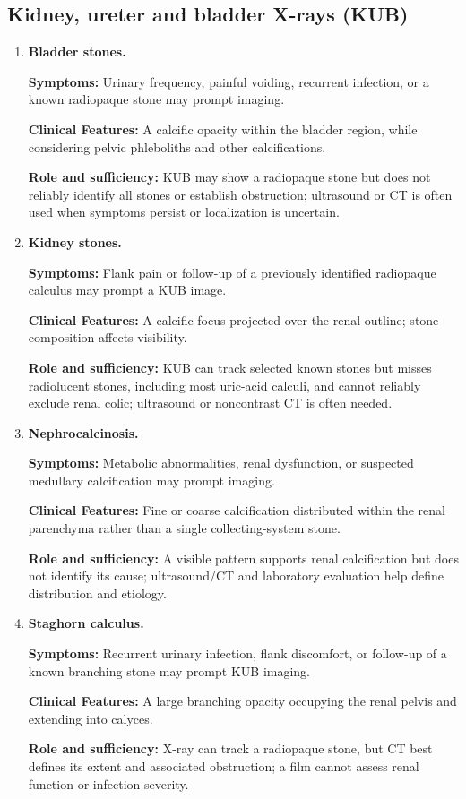 \subsection{Kidney, ureter and bladder X-rays (KUB)}
\begin{enumerate}[leftmargin=*,itemsep=0.45em,topsep=0.4em]
\item \textbf{Bladder stones.}\par\noindent\textbf{Symptoms:} Urinary frequency, painful voiding, recurrent infection, or a known radiopaque stone may prompt imaging.\par\noindent\textbf{Clinical Features:} A calcific opacity within the bladder region, while considering pelvic phleboliths and other calcifications.\par\noindent\textbf{Role and sufficiency:} KUB may show a radiopaque stone but does not reliably identify all stones or establish obstruction; ultrasound or CT is often used when symptoms persist or localization is uncertain.
\item \textbf{Kidney stones.}\par\noindent\textbf{Symptoms:} Flank pain or follow-up of a previously identified radiopaque calculus may prompt a KUB image.\par\noindent\textbf{Clinical Features:} A calcific focus projected over the renal outline; stone composition affects visibility.\par\noindent\textbf{Role and sufficiency:} KUB can track selected known stones but misses radiolucent stones, including most uric-acid calculi, and cannot reliably exclude renal colic; ultrasound or noncontrast CT is often needed.
\item \textbf{Nephrocalcinosis.}\par\noindent\textbf{Symptoms:} Metabolic abnormalities, renal dysfunction, or suspected medullary calcification may prompt imaging.\par\noindent\textbf{Clinical Features:} Fine or coarse calcification distributed within the renal parenchyma rather than a single collecting-system stone.\par\noindent\textbf{Role and sufficiency:} A visible pattern supports renal calcification but does not identify its cause; ultrasound/CT and laboratory evaluation help define distribution and etiology.
\item \textbf{Staghorn calculus.}\par\noindent\textbf{Symptoms:} Recurrent urinary infection, flank discomfort, or follow-up of a known branching stone may prompt KUB imaging.\par\noindent\textbf{Clinical Features:} A large branching opacity occupying the renal pelvis and extending into calyces.\par\noindent\textbf{Role and sufficiency:} X-ray can track a radiopaque stone, but CT best defines its extent and associated obstruction; a film cannot assess renal function or infection severity.

\end{enumerate}
